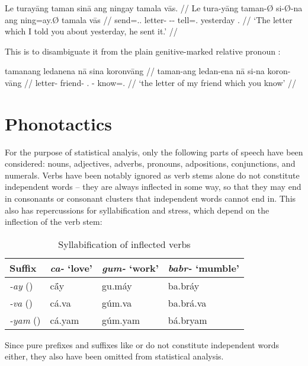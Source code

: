 \ex\begingl
	\gla Le turayāng taman sinā ang ningay tamala vās. //
	\glb Le tura-yāng taman-Ø si-Ø-na ang ning=ay.Ø tamala vās //
	\glc \PatTI{} send=\Tsg{}.\M{}.\Aarg{} letter-\Top{} \Rel{}-\PatTI{}-\Gen{} \AgtT{} tell=\Fsg{}.\Top{} yesterday \Ssg{}.\Parg{} //
	\glft `The letter which I told you about yesterday, he sent it.' //
\endgl\xe

This is to disambiguate it from the plain genitive-marked relative pronoun 
:

\ex\begingl
	\gla tamanang ledanena nā sina koronvāng //
	\glb taman-ang ledan-ena nā si-na koron-vāng //
	\glc letter-\Aarg{} friend-\Gen{} \Fsg.\Gen{} \Rel{}-\Gen{} know=\Ssg{}.\Aarg{} //
	\glft `the letter of my friend which you know' //
\endgl\xe

\section{Phonotactics}

For the purpose of statistical analyis, only the following parts of speech have 
been considered: nouns, adjectives, adverbs, pronouns, adpositions, 
conjunctions, and numerals. Verbs have been notably ignored as verb stems alone 
do not constitute independent words -- they are always inflected in some way, so 
that they may end in consonants or consonant clusters that independent words 
cannot end in. This also has repercussions for syllabification and stress, 
which depend on the inflection of the verb stem:

\begin{table}[h]
\label{ex:verbsyll}
\caption{Syllabification of inflected verbs}
\begin{tabu} to \linewidth {X[2l] X[3c] X[3c] X[3c]}
\toprule\tableheaderfont
Suffix
	& \emph{ca-} `love'
	& \emph{gum-} `work'
	& \emph{babr-} `mumble'
	\\

\toprule

\emph{-ay} (\Fsg{})
	& cā́y
	& gu.máy
	& ba.bráy
	\\

\emph{-va} (\Ssg{})
	& cá.va
	& gúm.va
	& ba.brá.va
	\\

\emph{-yam} (\Ptcp{})
	& cá.yam
	& gúm.yam
	& bá.bryam
	\\

\bottomrule
\end{tabu}
\end{table}

Since pure prefixes and suffixes like  or 
 do not constitute independent words either, 
they also have been omitted from statistical analysis.

\autocite{strasser:freq}

